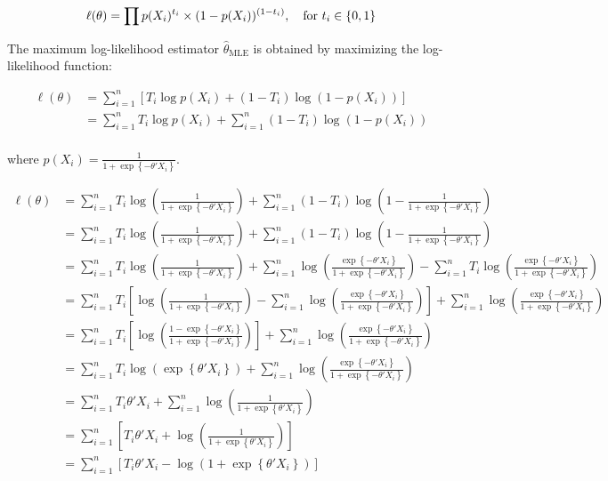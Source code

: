 \documentclass{article}
\begin{document}
$$
\ell(\theta) = \prod p(X_i)^{t_i} \times (1 - p(X_i))^{(1 - t_i)}, \quad \text{for} \\\ t_i \in \{ 0, 1 \}
$$

The maximum log-likelihood estimator \( \hat{\theta}_{\text{MLE}} \) is obtained by maximizing the log-likelihood function:

\begin{align*}
  \ell(\theta)
  &= \sum_{i=1}^n \left[ T_i \log p(X_i) + (1 - T_i) \log (1 - p(X_i)) \right] \\
  &= \sum_{i=1}^n T_i \log p(X_i) + \sum_{i=1}^n (1 - T_i) \log (1 - p(X_i)) \\
\end{align*}

where \( p(X_i) = \frac{1}{1 + \exp\left\{ - \theta' X_i \right\}} \).

\begin{align*}
  \ell(\theta)
  &= \sum_{i=1}^n T_i \log \left( \frac{1}{1 + \exp\left\{ - \theta' X_i \right\}} \right) + \sum_{i=1}^n (1 - T_i) \log \left( 1 - \frac{1}{1 + \exp\left\{ - \theta' X_i \right\}} \right) \\
  &= \sum_{i=1}^n T_i \log \left( \frac{1}{1 + \exp\left\{ - \theta' X_i \right\}} \right) + \sum_{i=1}^n (1 - T_i) \log \left( 1 - \frac{1}{1 + \exp\left\{ - \theta' X_i \right\}} \right) \\
  &= \sum_{i=1}^n T_i \log \left( \frac{1}{1 + \exp\left\{ - \theta' X_i \right\}} \right)
    + \sum_{i=1}^n \log \left( \frac{\exp\left\{ - \theta' X_i \right\}}{1 + \exp\left\{ - \theta' X_i \right\}} \right)
    - \sum_{i=1}^n T_i \log \left(\frac{\exp\left\{ - \theta' X_i \right\}}{1 + \exp\left\{ - \theta' X_i \right\}} \right) \\
  &= \sum_{i=1}^n T_i \left[ \log \left( \frac{1}{1 + \exp\left\{ - \theta' X_i \right\}} \right)
    - \sum_{i=1}^n \log \left(\frac{\exp\left\{ - \theta' X_i \right\}}{1 + \exp\left\{ - \theta' X_i \right\}} \right) \right]
    + \sum_{i=1}^n \log \left( \frac{\exp\left\{ - \theta' X_i \right\}}{1 + \exp\left\{ - \theta' X_i \right\}} \right) \\
  &= \sum_{i=1}^n T_i
    \left[
      \log \left( \frac{1 - \exp\left\{ - \theta' X_i \right\}}{1 + \exp\left\{ - \theta' X_i \right\}} \right)
    \right]
    + \sum_{i=1}^n \log \left( \frac{\exp\left\{ - \theta' X_i \right\}}{1 + \exp\left\{ - \theta' X_i \right\}} \right) \\
  &= \sum_{i=1}^n T_i
      \log \left( \exp\left\{ \theta' X_i \right\} \right)
    + \sum_{i=1}^n \log \left( \frac{\exp\left\{ - \theta' X_i \right\}}{1 + \exp\left\{ - \theta' X_i \right\}} \right) \\
  &= \sum_{i=1}^n T_i \theta' X_i 
    + \sum_{i=1}^n \log \left( \frac{1}{1 + \exp\left\{ \theta' X_i \right\}} \right) \\
  &= \sum_{i=1}^n
    \left[
      T_i \theta' X_i + \log \left( \frac{1}{1 + \exp\left\{ \theta' X_i \right\}} \right)
    \right]
    \\
  &= \sum_{i=1}^n
    \left[
      T_i \theta' X_i - \log \left( 1 + \exp\left\{ \theta' X_i \right\} \right)
    \right]
    \\
\end{align*}
\end{document}
